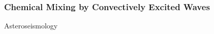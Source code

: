 {\color{purple}
\subsubsection{Chemical Mixing by Convectively Excited Waves}
}

Asteroseismology 

